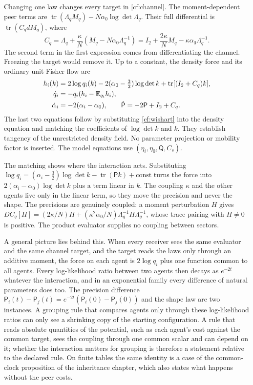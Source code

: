 Changing one law changes every target in \cref{cf:channel}. The moment-dependent peer terms are $\operatorname{tr}(\Lambda_qM_q)-N\alpha_0\log\det\Lambda_q$. Their full differential is $\operatorname{tr}(C_qdM_q)$, where
\begin{equation}
 C_q=\Lambda_q+\frac\kappa N
 (M_q-N\alpha_0\Lambda_q^{-1})
 =I_2+\frac{2\kappa}{N}M_q-\kappa\alpha_0\Lambda_q^{-1}.
 \label{cf:channel-force}
\end{equation}
The second term in the first expression comes from differentiating the channel. Freezing the target would remove it. Up to a constant, the density force and its ordinary unit-Fisher flow are
\begin{equation}
 \begin{aligned}
 h_i(k)&=2\log q_i(k)-2(\alpha_0-\tfrac32)\log\det k
       +\operatorname{tr}[(I_2+C_q)k],\\
 \dot q_i&=-q_i(h_i-\mathbb E_{q_i}h_i),\\
 \dot\alpha_i&=-2(\alpha_i-\alpha_0),
 \qquad \dot{\mathsf P}=-2\mathsf P+I_2+C_q.
 \end{aligned}
 \label{cf:full-flow}
\end{equation}
The last two equations follow by substituting \cref{cf:wishart} into the density equation and matching the coefficients of $\log\det k$ and $k$. They establish tangency of the unrestricted density field. No parameter projection or mobility factor is inserted. The model equations use $(\eta_i,\eta_0,\mathsf Q,C_s)$.

The matching shows where the interaction acts. Substituting $\log q_i=(\alpha_i-\tfrac32)\log\det k-\operatorname{tr}(\mathsf Pk)+\mathrm{const}$ turns the force into $2(\alpha_i-\alpha_0)\log\det k$ plus a term linear in $k$. The coupling $\kappa$ and the other agents live only in the linear term, so they move the precision and never the shape. The precisions are genuinely coupled: a moment perturbation $H$ gives $DC_q[H]=(2\kappa/N)H+(\kappa^2\alpha_0/N)\Lambda_q^{-1}H\Lambda_q^{-1}$, whose trace pairing with $H\ne0$ is positive. The product evaluator supplies no coupling between sectors.

A general picture lies behind this. When every receiver sees the same evaluator and the same channel target, and the target reads the laws only through an additive moment, the force on each agent is $2\log q_i$ plus one function common to all agents. Every log-likelihood ratio between two agents then decays as $e^{-2t}$ whatever the interaction, and in an exponential family every difference of natural parameters does too. The precision difference $\mathsf P_i(t)-\mathsf P_j(t)=e^{-2t}(\mathsf P_i(0)-\mathsf P_j(0))$ and the shape law are two instances. A grouping rule that compares agents only through these log-likelihood ratios can only see a shrinking copy of the starting configuration. A rule that reads absolute quantities of the potential, such as each agent's cost against the common target, sees the coupling through one common scalar and can depend on it; whether the interaction matters for grouping is therefore a statement relative to the declared rule. On finite tables the same identity is a case of the common-clock proposition of the inheritance chapter, which also states what happens without the peer costs.

